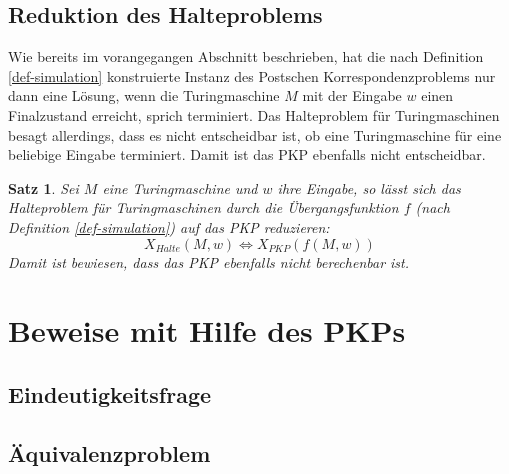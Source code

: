 \documentclass[]{scrartcl}
\newtheorem{satz}[definition]{Satz}
\begin{document}
	\subsection{Reduktion des Halteproblems}
	
		Wie bereits im vorangegangen Abschnitt beschrieben, hat die nach Definition \ref{def-simulation} konstruierte Instanz des Postschen Korrespondenzproblems nur dann eine Lösung, wenn die Turingmaschine $M$ mit der Eingabe $w$ einen Finalzustand erreicht, sprich terminiert. Das Halteproblem für Turingmaschinen besagt allerdings, dass es nicht entscheidbar ist, ob eine Turingmaschine für eine beliebige Eingabe terminiert. Damit ist das PKP ebenfalls nicht entscheidbar.
		
		\begin{satz}
		Sei $M$ eine Turingmaschine und $w$ ihre Eingabe, so lässt sich das Halteproblem für Turingmaschinen durch die Übergangsfunktion $f$ (nach Definition \ref{def-simulation}) auf das PKP reduzieren:
		\[X_{Halte} (M, w) \Leftrightarrow X_{PKP}(f(M, w))\]
		Damit ist bewiesen, dass das PKP ebenfalls nicht berechenbar ist.
		\end{satz}

\section{Beweise mit Hilfe des PKPs}

	\subsection{Eindeutigkeitsfrage}

	\subsection{Äquivalenzproblem}
\end{document}
